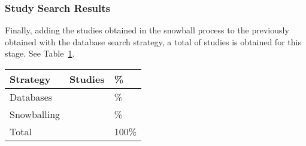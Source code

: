 \newcommand{\totalEtapaDos}{\fpeval{\screenTot + \snowballNewStudies}}
\newcommand{\dbPercentEtapa}{\fpeval{round(\screenTot*100/\totalEtapaDos,2)}}
\newcommand{\snowPercentEtapa}{\fpeval{round(\snowballNewStudies*100/\totalEtapaDos,2)}}

\subsubsection{Study Search Results}\label{subsubsec:resultados-busqueda}

Finally, adding the \snowballNewStudies{} studies obtained in the snowball process to the \screenTot{} previously obtained with the database search strategy, a total of \totalEtapaDos{} studies is obtained for this stage. See Table~\ref{table:resultados_etapa_2}.

\begin{table}
	{
	\begin{tabular}{p{2.5cm}p{2.6cm}p{2.5cm}} \toprule
		\textbf{Strategy} & \textbf{Studies}      & \textbf{\%}           \\
		\midrule
		Databases         & \screenTot{}          & \dbPercentEtapa{}\%   \\
		Snowballing       & \snowballNewStudies{} & \snowPercentEtapa{}\% \\
		Total             & \totalEtapaDos        & 100\%                 \\
		\bottomrule
	\end{tabular}}
	\label{table:resultados_etapa_2}
\end{table}
